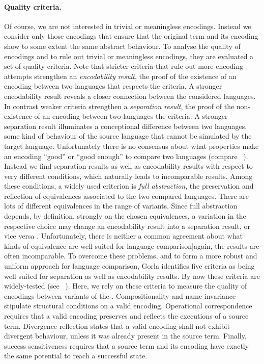\documentclass[]{article}
\begin{document}
\paragraph{Quality criteria.} Of course, we are not interested in trivial or meaningless encodings. Instead we consider only those encodings that ensure that the original term and its encoding show to some extent the same abstract behaviour. To analyse the quality of encodings and to rule out trivial or meaningless encodings, they are evaluated \wrt a set of quality criteria.
Note that stricter criteria that rule out more encoding attempts strengthen an \emph{encodability result}, \ie the proof of the existence of an encoding between two languages that respects the criteria. A stronger encodability result reveals a closer connection between the considered languages.
In contrast weaker criteria strengthen a \emph{separation result}, \ie the proof of the non-existence of an encoding between two languages \wrt the criteria. A stronger separation result illuminates a conceptional difference between two languages, \ie some kind of behaviour of the source language that cannot be simulated by the target language.
Unfortunately there is no consensus about what properties make an encoding ``good'' or ``good enough'' to compare two languages (compare \eg~\cite{parrow08}). Instead we find separation results as well as encodability results with respect to very different conditions, which naturally leads to incomparable results.
Among these conditions, a widely used criterion is \emph{full abstraction}, \ie the preservation and reflection of equivalences associated to the two compared languages. There are lots of different equivalences in the range of \piCal variants. Since full abstraction depends, by definition, strongly on the chosen equivalences, a variation in the respective choice may change an encodability result into a separation result, or vice versa \cite{gorlaNestmann}. Unfortunately, there is neither a common agreement about what kinds of equivalence are well suited for language comparison{|}again, the results are often incomparable.
To overcome these problems, and to form a more robust and uniform approach for language comparison, Gorla \cite{gorla} identifies five criteria as being well suited for separation as well as encodability results. By now these criteria are widely-tested (see \eg~\cite{gorla10}). Here, we rely on these criteria to measure the quality of encodings between variants of the \piCal.
Compositionality and name invariance stipulate structural conditions on a valid encoding. Operational correspondence requires that a valid encoding preserves and reflects the executions of a source term. Divergence reflection states that a valid encoding shall not exhibit divergent behaviour, unless it was already present in the source term. Finally, success sensitiveness requires that a source term and its encoding have exactly the same potential to reach a successful state.
\end{document}
